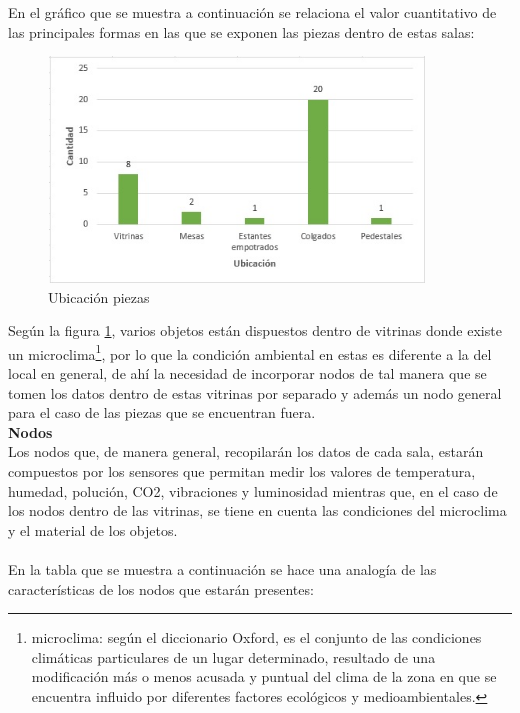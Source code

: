     En el gráfico que se muestra a continuación se relaciona el valor cuantitativo de las principales formas en las que se exponen las piezas dentro de estas salas:\newline

    \begin{figure}[h]
        \centering
        \includegraphics[width=10cm, height=6cm]{imagenes/formas expositivas.jpg}
        \caption{Ubicación piezas}
        \label{imag:ubicacion_piezas}
    \end{figure}

    Según la figura \ref{imag:ubicacion_piezas}, varios objetos están dispuestos dentro de vitrinas donde existe un microclima\footnote{microclima: según el diccionario Oxford, es el conjunto de las condiciones climáticas particulares de un lugar determinado, resultado de una modificación más o menos acusada y puntual del clima de la zona en que se encuentra influido por diferentes factores ecológicos y medioambientales.}, por lo que la condición ambiental en estas es diferente a la del local en general, de ahí la necesidad de incorporar nodos de tal manera que se tomen los datos dentro de estas vitrinas por separado y además un nodo general para el caso de las piezas que se encuentran fuera.\\

    \textbf{Nodos}\\
    Los nodos que, de manera general, recopilarán los datos de cada sala, estarán compuestos por los sensores que permitan medir los valores de temperatura, humedad, polución, CO2, vibraciones y luminosidad mientras que, en el caso de los nodos dentro de las vitrinas, se tiene en cuenta las condiciones del microclima y el material de los objetos.\\\\

    En la tabla que se muestra a continuación se hace una analogía de las características de los nodos que estarán presentes:\\

